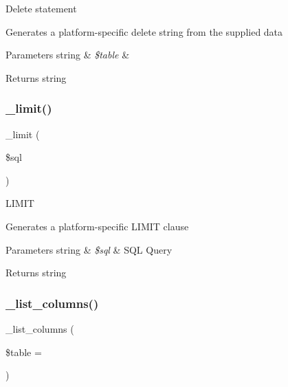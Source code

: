 Delete statement

Generates a platform-\/specific delete string from the supplied data


\begin{DoxyParams}[1]{Parameters}
string & {\em \$table} & \\
\hline
\end{DoxyParams}
\begin{DoxyReturn}{Returns}
string 
\end{DoxyReturn}
\mbox{\label{class_c_i___d_b__pdo__pgsql__driver_a3a02ea06541b8ecc25a33a61651562c8}} 
\subsubsection{\texorpdfstring{\+\_\+limit()}{\_limit()}}
{\footnotesize\ttfamily \+\_\+limit (\begin{DoxyParamCaption}\item[{}]{\$sql }\end{DoxyParamCaption})\hspace{0.3cm}{\ttfamily [protected]}}

L\+I\+M\+IT

Generates a platform-\/specific L\+I\+M\+IT clause


\begin{DoxyParams}[1]{Parameters}
string & {\em \$sql} & S\+QL Query \\
\hline
\end{DoxyParams}
\begin{DoxyReturn}{Returns}
string 
\end{DoxyReturn}
\mbox{\label{class_c_i___d_b__pdo__pgsql__driver_a7ccb7f9c301fe7f0a9db701254142b63}} 
\subsubsection{\texorpdfstring{\+\_\+list\+\_\+columns()}{\_list\_columns()}}
{\footnotesize\ttfamily \+\_\+list\+\_\+columns (\begin{DoxyParamCaption}\item[{}]{\$table = {\ttfamily \textquotesingle{}\textquotesingle{}} }\end{DoxyParamCaption})\hspace{0.3cm}{\ttfamily [protected]}}

